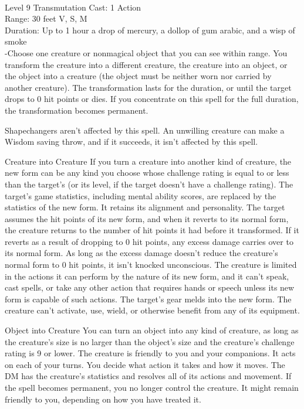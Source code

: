 \documentclass[10pt,twocolumn]{report}
\begin{document}
 \\
Level 9 \quad Transmutation \quad Cast: 1 Action\\
Range: 30 feet \quad V, S, M\\
Duration: Up to 1 hour \quad a drop of mercury, a dollop of gum arabic, and a wisp of smoke\\
-Choose one creature or nonmagical object that you can see within range. You transform the creature into a different creature, the creature into an object, or the object into a creature (the object must be neither worn nor carried by another creature). The transformation lasts for the duration, or until the target drops to 0 hit points or dies. If you concentrate on this spell for the full duration, the transformation becomes permanent.

Shapechangers aren’t affected by this spell. An unwilling creature can make a Wisdom saving throw, and if it succeeds, it isn’t affected by this spell.

Creature into Creature
If you turn a creature into another kind of creature, the new form can be any kind you choose whose challenge rating is equal to or less than the target’s (or its level, if the target doesn’t have a challenge rating). The target’s game statistics, including mental ability scores, are replaced by the statistics of the new form. It retains its alignment and personality.
The target assumes the hit points of its new form, and when it reverts to its normal form, the creature returns to the number of hit points it had before it transformed. If it reverts as a result of dropping to 0 hit points, any excess damage carries over to its normal form. As long as the excess damage doesn’t reduce the creature’s normal form to 0 hit points, it isn’t knocked unconscious.
The creature is limited in the actions it can perform by the nature of its new form, and it can’t speak, cast spells, or take any other action that requires hands or speech unless its new form is capable of such actions.
The target’s gear melds into the new form. The creature can’t activate, use, wield, or otherwise benefit from any of its equipment.

Object into Creature
You can turn an object into any kind of creature, as long as the creature’s size is no larger than the object’s size and the creature’s challenge rating is 9 or lower. The creature is friendly to you and your companions. It acts on each of your turns. You decide what action it takes and how it moves. The DM has the creature’s statistics and resolves all of its actions and movement.
If the spell becomes permanent, you no longer control the creature. It might remain friendly to you, depending on how you have treated it.
\end{document}
